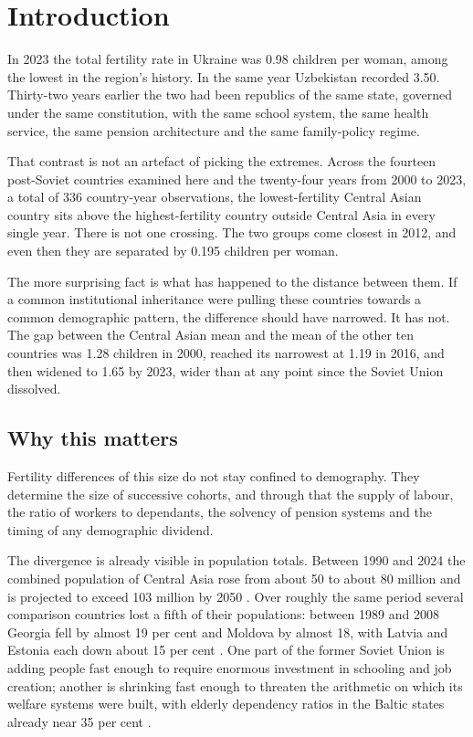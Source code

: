 
\section{Introduction}
\label{sec:introduction}

In 2023 the total fertility rate in Ukraine was 0.98 children per woman, among the lowest in the region's history. In the same year Uzbekistan recorded 3.50. Thirty-two years earlier the two had been republics of the same state, governed under the same constitution, with the same school system, the same health service, the same pension architecture and the same family-policy regime.

That contrast is not an artefact of picking the extremes. Across the fourteen post-Soviet countries examined here and the twenty-four years from 2000 to 2023, a total of 336 country-year observations, the lowest-fertility Central Asian country sits above the highest-fertility country outside Central Asia in every single year. There is not one crossing. The two groups come closest in 2012, and even then they are separated by 0.195 children per woman.

The more surprising fact is what has happened to the distance between them. If a common institutional inheritance were pulling these countries towards a common demographic pattern, the difference should have narrowed. It has not. The gap between the Central Asian mean and the mean of the other ten countries was 1.28 children in 2000, reached its narrowest at 1.19 in 2016, and then widened to 1.65 by 2023, wider than at any point since the Soviet Union dissolved.

\subsection{Why this matters}
\label{sec:why-it-matters}

Fertility differences of this size do not stay confined to demography. They determine the size of successive cohorts, and through that the supply of labour, the ratio of workers to dependants, the solvency of pension systems and the timing of any demographic dividend.

The divergence is already visible in population totals. Between 1990 and 2024 the combined population of Central Asia rose from about 50 to about 80 million and is projected to exceed 103 million by 2050 \parencite{tukumov2024}. Over roughly the same period several comparison countries lost a fifth of their populations: between 1989 and 2008 Georgia fell by almost 19 per cent and Moldova by almost 18, with Latvia and Estonia each down about 15 per cent \parencite{brainerd2010}. One part of the former Soviet Union is adding people fast enough to require enormous investment in schooling and job creation; another is shrinking fast enough to threaten the arithmetic on which its welfare systems were built, with elderly dependency ratios in the Baltic states already near 35 per cent \parencite{brainerd2010}.

